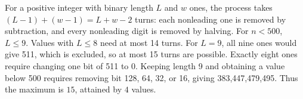For a positive integer with binary length $ L $ and $ w $ ones, the process takes $(L-1)+(w-1)=L+w-2 $ turns: each nonleading one is removed by subtraction, and every nonleading digit is removed by halving. For $ n<500 $, $ L\le9 $. Values with $ L\le8 $ need at most 14 turns. For $ L=9 $, all nine ones would give 511, which is excluded, so at most 15 turns are possible. Exactly eight ones require changing one bit of 511 to 0. Keeping length 9 and obtaining a value below 500 requires removing bit 128, 64, 32, or 16, giving 383,447,479,495. Thus the maximum is $\boxed{15}$, attained by $\boxed4 $ values.
